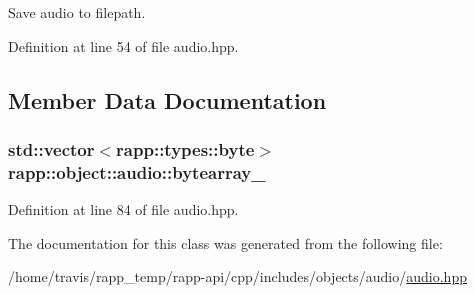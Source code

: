 Save audio to filepath. 



Definition at line 54 of file audio.\-hpp.



\subsection{Member Data Documentation}
\hypertarget{classrapp_1_1object_1_1audio_a1ccd44fcbf55525739ef0c2f41de6878}{
\subsubsection[{bytearray\-\_\-}]{\setlength{\rightskip}{0pt plus 5cm}std\-::vector$<${\bf rapp\-::types\-::byte}$>$ rapp\-::object\-::audio\-::bytearray\-\_\-\hspace{0.3cm}{\ttfamily [private]}}}\label{classrapp_1_1object_1_1audio_a1ccd44fcbf55525739ef0c2f41de6878}


Definition at line 84 of file audio.\-hpp.



The documentation for this class was generated from the following file\-:\begin{DoxyCompactItemize}
\item 
/home/travis/rapp\-\_\-temp/rapp-\/api/cpp/includes/objects/audio/\hyperlink{audio_8hpp}{audio.\-hpp}\end{DoxyCompactItemize}

